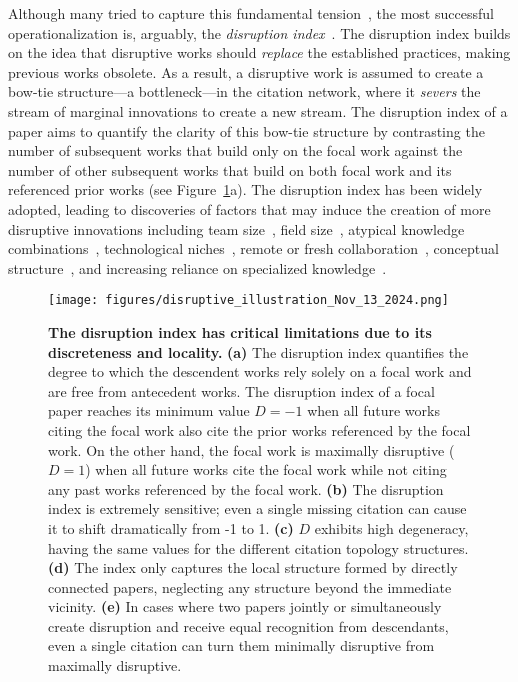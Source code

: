 \documentclass[12pt]{article}
\begin{document}
Although many tried to capture this fundamental tension~\cite{uzzi2013atypical,kim2022quantifying,milojevic2015quantifying}, the most successful operationalization is, arguably, the \emph{disruption index}~\cite{funk2017dynamic,wu2019large}. The disruption index builds on the idea that disruptive works should \emph{replace} the established practices, making previous works obsolete. 
As a result, a disruptive work is assumed to create a bow-tie structure---a bottleneck---in the citation network, where it \emph{severs} the stream of marginal innovations to create a new stream. The disruption index of a paper aims to quantify the clarity of this bow-tie structure by contrasting the number of subsequent works that build only on the focal work against the number of other subsequent works that build on both focal work and its referenced prior works (see Figure~\ref{fig:problems}a). The disruption index has been widely adopted, leading to discoveries of factors that may induce the creation of more disruptive innovations including team size~\cite{wu2019large}, field size~\cite{chu2021slowed}, atypical knowledge combinations~\cite{lin2022new}, technological niches~\cite{qu2024outliers}, remote or fresh collaboration~\cite{lin2023remote,zeng2021fresh},  conceptual structure~\cite{kedrick2024conceptual}, and increasing reliance on specialized knowledge~\cite{park2023papers}.


\begin{figure}
    \centering
    \texttt{[image: figures/disruptive\_illustration\_Nov\_13\_2024.png]}
    \caption{ \textbf{The disruption index has critical limitations due to its discreteness and locality.} \textbf{(a)} The disruption index quantifies the degree to which the descendent works rely solely on a focal work and are free from antecedent works. The disruption index of a focal paper reaches its minimum value $D=-1$ when all future works citing the focal work also cite the prior works referenced by the focal work. On the other hand, the focal work is maximally disruptive ($D=1$) when all future works cite the focal work while not citing any past works referenced by the focal work.  
   \textbf{(b)} 
   The disruption index is extremely sensitive; even a single missing citation can cause it to shift dramatically from -1 to 1.
    \textbf{(c)} $D$ exhibits high degeneracy, having the same values for the different citation topology structures. 
    \textbf{(d)} The index only captures the local structure formed by directly connected papers, neglecting any structure beyond the immediate vicinity.   \textbf{(e)} In cases where two papers jointly or simultaneously create disruption and receive equal recognition from descendants, even a single citation can turn them minimally disruptive from maximally disruptive. }
    \label{fig:problems}
\end{figure}    
\end{document}
